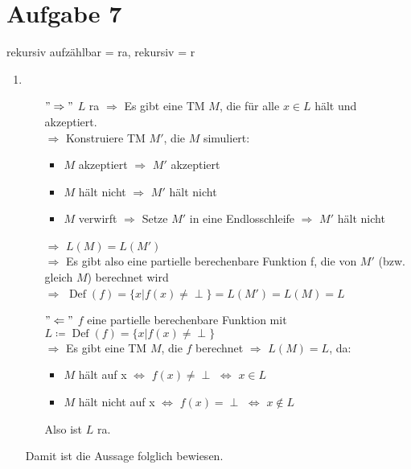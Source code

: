 \documentclass[a4paper,11pt]{scrartcl}
\begin{document}
	\section*{Aufgabe 7}
	rekursiv aufzählbar = ra, rekursiv = r
	\begin{enumerate}[label=\alph*)]
	\item	\begin{itemize}
			\item[$"\Rightarrow"$]
				$L$ ra $\Rightarrow$ Es gibt eine TM $M$, die für alle $x\in L$ hält und akzeptiert.\\
				$\Rightarrow$ Konstruiere TM $M'$, die $M$ simuliert:
					\begin{itemize}
					\item $M$ akzeptiert $\Rightarrow$ $M'$ akzeptiert
					\item $M$ hält nicht $\Rightarrow$ $M'$ hält nicht
					\item $M$ verwirft $\Rightarrow$ Setze $M'$ in eine Endlosschleife $\Rightarrow$ $M'$ hält nicht
					\end{itemize}
				$\Rightarrow$ $L(M)=L(M')$\\
				$\Rightarrow$ Es gibt also eine partielle berechenbare Funktion f, die von $M'$ (bzw. gleich $M$) berechnet wird\\
				$\Rightarrow$ $\operatorname{Def}(f)=\{x \vert f(x) \neq \perp\}=L(M')=L(M)=L$
			
			\item[$"\Leftarrow"$]
				$f$ eine partielle berechenbare Funktion mit $L \coloneqq \operatorname{Def}(f)=\{x \vert f(x) \neq \perp\}$\\
				$\Rightarrow$ Es gibt eine TM $M$, die $f$ berechnet
				$\Rightarrow$ $L(M)=L$, da:
					\begin{itemize}
					\item $M$ hält auf x $\Leftrightarrow$ $f(x) \neq \perp$ $\Leftrightarrow$ $x\in L$
					\item $M$ hält nicht auf x $\Leftrightarrow$ $f(x) = \perp$ $\Leftrightarrow$ $x\not\in L$
					\end{itemize}
				Also ist $L$ ra.
			\end{itemize}
			Damit ist die Aussage folglich bewiesen.
			

\end{enumerate}
\end{document}
